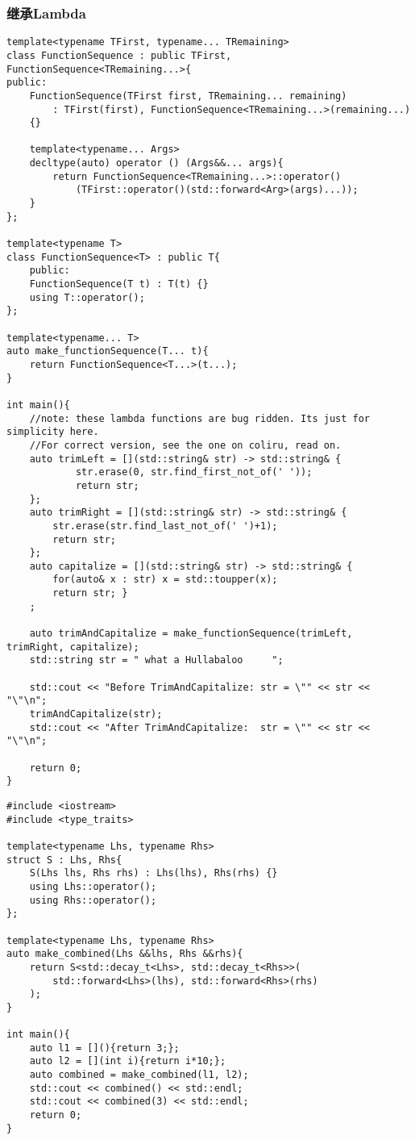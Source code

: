 \documentclass{article}
\begin{document}
\subsubsection{继承Lambda}
\begin{verbatim}
template<typename TFirst, typename... TRemaining>
class FunctionSequence : public TFirst, FunctionSequence<TRemaining...>{
public:
    FunctionSequence(TFirst first, TRemaining... remaining)
        : TFirst(first), FunctionSequence<TRemaining...>(remaining...)
    {}

    template<typename... Args>
    decltype(auto) operator () (Args&&... args){
        return FunctionSequence<TRemaining...>::operator()
            (TFirst::operator()(std::forward<Arg>(args)...));
    }
};

template<typename T>
class FunctionSequence<T> : public T{
    public:
    FunctionSequence(T t) : T(t) {}
    using T::operator();
};

template<typename... T>
auto make_functionSequence(T... t){
    return FunctionSequence<T...>(t...);
}

int main(){
    //note: these lambda functions are bug ridden. Its just for simplicity here.
    //For correct version, see the one on coliru, read on.
    auto trimLeft = [](std::string& str) -> std::string& { 
            str.erase(0, str.find_first_not_of(' ')); 
            return str; 
    };
    auto trimRight = [](std::string& str) -> std::string& { 
        str.erase(str.find_last_not_of(' ')+1); 
        return str; 
    };
    auto capitalize = [](std::string& str) -> std::string& { 
        for(auto& x : str) x = std::toupper(x); 
        return str; }
    ;

    auto trimAndCapitalize = make_functionSequence(trimLeft, trimRight, capitalize);
    std::string str = " what a Hullabaloo     ";

    std::cout << "Before TrimAndCapitalize: str = \"" << str << "\"\n";
    trimAndCapitalize(str);
    std::cout << "After TrimAndCapitalize:  str = \"" << str << "\"\n";

    return 0;
}
\end{verbatim}


\begin{verbatim}
#include <iostream>
#include <type_traits>

template<typename Lhs, typename Rhs>
struct S : Lhs, Rhs{
    S(Lhs lhs, Rhs rhs) : Lhs(lhs), Rhs(rhs) {}
    using Lhs::operator();
    using Rhs::operator();
};

template<typename Lhs, typename Rhs>
auto make_combined(Lhs &&lhs, Rhs &&rhs){
    return S<std::decay_t<Lhs>, std::decay_t<Rhs>>(
        std::forward<Lhs>(lhs), std::forward<Rhs>(rhs)
    );
}

int main(){
    auto l1 = [](){return 3;};
    auto l2 = [](int i){return i*10;};
    auto combined = make_combined(l1, l2);
    std::cout << combined() << std::endl;
    std::cout << combined(3) << std::endl;
    return 0;
}
\end{verbatim}
\end{document}
